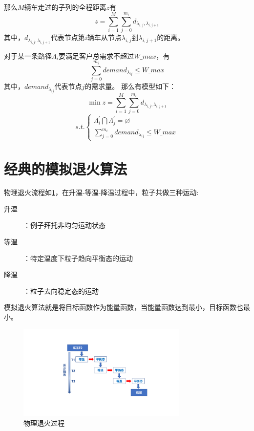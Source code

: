 \documentclass{nudt}
\begin{document}
那么$M$辆车走过的子列的全程距离$z$有
\[
	z = \sum\limits_{i=1}^{M}\sum\limits_{j = 0}^{m_{i}}d_{\lambda_{i,j},\lambda_{i,j+1}}
\]
其中，$d_{\lambda_{i,j},\lambda_{i,j+1}}$代表节点第$i$辆车从节点$\lambda_{i,j}$到$\lambda_{i,j+1}$的距离。

对于某一条路径$\Lambda_i$要满足客户总需求不超过$W\_max$，有
\[
	\sum\limits_{j = 0}^{m_{i}}demand_{\lambda_{ij}}\leqslant W\_max
\]
其中，$demand_{\lambda_{ij}}$代表节点$j$的需求量。
那么有模型如下：
\[
	\min z = \sum\limits_{i=1}^{M}\sum\limits_{j = 0}^{m_{i}}d_{\lambda_{i,j},\lambda_{i,j+1}}
\]
\[s.t.\left\{
	\begin{array}{l}
		\Lambda_i^{'} \bigcap \Lambda_j^{'} = \varnothing \\
		\sum\limits_{j = 0}^{m_{i}}demand_{\lambda_{ij}}\leqslant W\_max
	\end{array}
	\right.
\]

\section{经典的模拟退火算法}
物理退火流程如\cref{fig:physics_a}，在升温-等温-降温过程中，粒子共做三种运动:
\begin{description}
	\item[升温]：例子拜托非均匀运动状态 
	\item[等温]：特定温度下粒子趋向平衡态的运动
	\item[降温]：粒子去向稳定态的运动  
\end{description}
模拟退火算法就是将目标函数作为能量函数，当能量函数达到最小，目标函数也最小。
\begin{figure}[H]
	\centering
	\includegraphics[width=0.75\textwidth]{image/A.pdf}
	\caption{物理退火过程}
	\label{fig:physics_a}
\end{figure}
\end{document}
